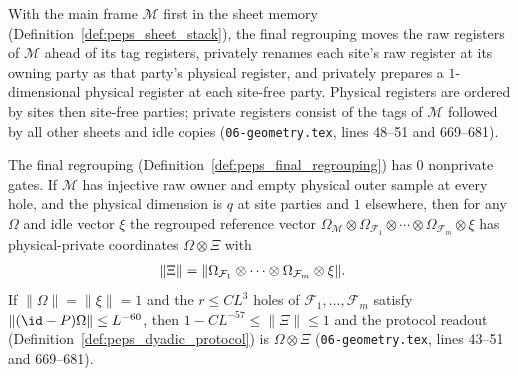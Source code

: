 \begin{definition}
    \label{def:peps_final_regrouping}
    \leanok
    With the main frame $\mathcal M$ first in the sheet memory (Definition~\ref{def:peps_sheet_stack}), the final regrouping moves the raw registers of $\mathcal M$ ahead of its tag registers, privately renames each site's raw register at its owning party as that party's physical register, and privately prepares a $1$-dimensional physical register at each site-free party. Physical registers are ordered by sites then site-free parties; private registers consist of the tags of $\mathcal M$ followed by all other sheets and idle copies (\texttt{06-geometry.tex}, lines 48--51 and 669--681).
\end{definition}

\begin{lemma}
    \label{thm:peps_final_reference}
    \leanok
    The final regrouping (Definition~\ref{def:peps_final_regrouping}) has $0$ nonprivate gates. If $\mathcal M$ has injective raw owner and empty physical outer sample at every hole, and the physical dimension is $q$ at site parties and $1$ elsewhere, then for any $\Omega$ and idle vector $\xi$ the regrouped reference vector $\Omega_{\mathcal M}\otimes\Omega_{\mathcal F_1}\otimes\cdots\otimes\Omega_{\mathcal F_m}\otimes\xi$ has physical-private coordinates $\Omega\otimes\Xi$ with
    \begin{align}
        \lVert\Xi\rVert & = \lVert\Omega_{\mathcal F_1}\otimes\cdots\otimes\Omega_{\mathcal F_m}\otimes\xi\rVert. \notag
    \end{align}
    If $\lVert\Omega\rVert=\lVert\xi\rVert=1$ and the $r\le CL^3$ holes of $\mathcal F_1,\dots,\mathcal F_m$ satisfy $\lVert(\id-P)\Omega\rVert\le L^{-60}$, then $1-CL^{-57}\le\lVert\Xi\rVert\le1$ and the protocol readout (Definition~\ref{def:peps_dyadic_protocol}) is $\Omega\otimes\Xi$ (\texttt{06-geometry.tex}, lines 43--51 and 669--681).
\end{lemma}

